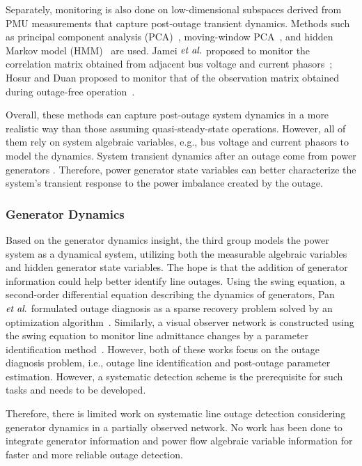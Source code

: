 Separately, monitoring is also done on low-dimensional subspaces derived from PMU measurements that capture post-outage transient dynamics. Methods such as principal component analysis (PCA)~\cite{Xie2014}, moving-window PCA~\cite{Rafferty2016}, and hidden Markov model (HMM)~\cite{Huang2016b} are used. Jamei $\textit{et al}.$ proposed to monitor the correlation matrix obtained from adjacent bus voltage and current phasors~\cite{Jamei2017a}; Hosur and Duan proposed to monitor that of the observation matrix obtained during outage-free operation~\cite{Hosur2019}. 

Overall, these methods can capture post-outage system dynamics in a more realistic way than those assuming quasi-steady-state operations. However, all of them rely on system algebraic variables, e.g., bus voltage and current phasors to model the dynamics. System transient dynamics after an outage come from power generators \cite{Glover2012}. Therefore, power generator state variables can better characterize the system's transient response to the power imbalance created by the outage.

\subsubsection{Generator Dynamics}
Based on the generator dynamics insight, the third group models the power system as a dynamical system, utilizing both the measurable algebraic variables and hidden generator state variables. The hope is that the addition of generator information could help better identify line outages. Using the swing equation, a second-order differential equation describing the dynamics of generators, Pan $\textit{et al}.$ formulated outage diagnosis as a sparse recovery problem solved by an optimization algorithm~\cite{Pan2015a}. Similarly, a visual observer network is constructed using the swing equation to monitor line admittance changes by a parameter identification method~\cite{Yang2016b}. However, both of these works focus on the outage diagnosis problem, i.e., outage line identification and post-outage parameter estimation. However, a systematic detection scheme is the prerequisite for such tasks and needs to be developed.

Therefore, there is limited work on systematic line outage detection  considering generator dynamics in a partially observed network. No work has been done to integrate generator information and power flow algebraic variable information for faster and more reliable outage detection.



